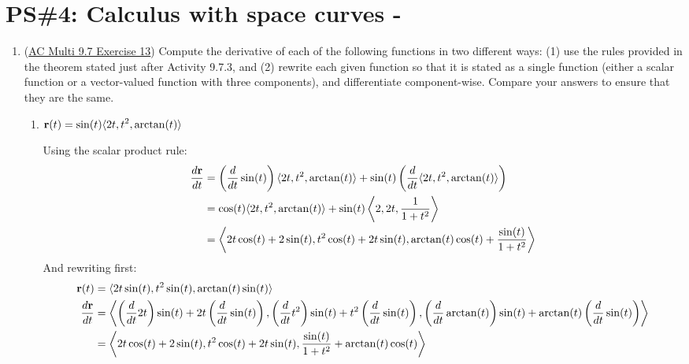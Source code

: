


%


\allowdisplaybreaks
\section{PS\#4: Calculus with space curves -  }

\begin{enumerate}[leftmargin=0pt]

\item (\href{https://activecalculus.org/multi/S-9-7-Vector-Valued-Functions-Derivatives.html#Ez_9_7_1}{AC Multi 9.7 Exercise 13}) Compute the derivative of each of the following functions in two different ways: (1) use the rules provided in the theorem stated just after Activity 9.7.3, and (2) rewrite each given function so that it is stated as a single function (either a scalar function or a vector-valued function with three components), and differentiate component-wise. Compare your answers to ensure that they are the same.
\begin{enumerate}
    \item $\displaystyle \mathbf{r}(t) = \sin(t) \langle 2t, t^2, \arctan(t) \rangle$
    
    \begin{red}
        Using the scalar product rule:
        \begin{align*}
            \frac{d\mathbf{r}}{dt} &= \left(\dfrac{d}{dt}\sin(t)\right) 
            \langle 2t, t^2, \arctan(t) \rangle
            + \sin(t)
            \left(\dfrac{d}{dt} \langle 2t, t^2, \arctan(t) \rangle\right) \\
            &= \cos(t) \langle 2t, t^2, \arctan(t) \rangle
            + \sin(t) \left\langle 2, 2t, \dfrac{1}{1+t^2} \right\rangle \\
            &= \left\langle 2t\cos(t) + 2\sin(t),
                            t^2\cos(t)+2t\sin(t),
                            \arctan(t) \cos(t) + \dfrac{\sin(t)}{1+t^2} \right\rangle
        \end{align*}
        And rewriting first:
        \begin{align*}
            \mathbf{r}(t) &= \langle 2t \sin(t) , t^2 \sin(t) , \arctan(t) \sin(t)  \rangle \\
            \frac{d\mathbf{r}}{dt} &= \left\langle
                    \left(\frac{d}{dt} 2t\right) \sin(t) + 2t \left(\frac{d}{dt}\sin(t)\right),
                    \left(\frac{d}{dt}t^2\right)\sin(t) + t^2 \left(\frac{d}{dt}\sin(t)\right),
                    \left(\frac{d}{dt}\arctan(t)\right) \sin(t) + \arctan(t) \left(\frac{d}{dt} \sin(t) \right)
                \right\rangle \\
                &= \left\langle 2t\cos(t) + 2\sin(t),
                t^2\cos(t)+2t\sin(t),
                \dfrac{\sin(t)}{1+t^2} + \arctan(t) \cos(t) \right\rangle
        \end{align*}
    \end{red}


\end{enumerate}
\end{enumerate}
